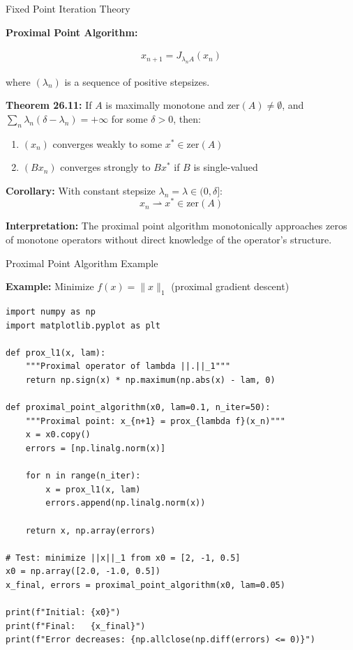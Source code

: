 \documentclass[aspectratio=169,10pt]{beamer}
\begin{document}
\begin{frame}{Fixed Point Iteration Theory}

\textbf{Proximal Point Algorithm:}

\begin{align*}
  x_{n+1} = J_{\lambda_n A}(x_n)
\end{align*}

where $(\lambda_n)$ is a sequence of positive stepsizes.

\vspace{0.3cm}
\textbf{Theorem 26.11:} If $A$ is maximally monotone and $\text{zer}(A) \neq \emptyset$, and $\sum_n \lambda_n(\delta - \lambda_n) = +\infty$ for some $\delta > 0$, then:
\begin{enumerate}
  \item $(x_n)$ converges weakly to some $x^* \in \text{zer}(A)$

  \item $(B x_n)$ converges strongly to $B x^*$ if $B$ is single-valued
\end{enumerate}

\vspace{0.3cm}
\textbf{Corollary:} With constant stepsize $\lambda_n = \lambda \in (0, \delta]$:
\[ x_n \rightharpoonup x^* \in \text{zer}(A) \]

\vspace{0.3cm}
\textbf{Interpretation:} The proximal point algorithm monotonically approaches zeros of monotone operators without direct knowledge of the operator's structure.

\end{frame}

\begin{frame}[fragile]{Proximal Point Algorithm Example}

\textbf{Example:} Minimize $f(x) = \|x\|_1$ (proximal gradient descent)

\vspace{0.2cm}
\lstset{basicstyle=\ttfamily\footnotesize}
\begin{lstlisting}
import numpy as np
import matplotlib.pyplot as plt

def prox_l1(x, lam):
    """Proximal operator of lambda ||.||_1"""
    return np.sign(x) * np.maximum(np.abs(x) - lam, 0)

def proximal_point_algorithm(x0, lam=0.1, n_iter=50):
    """Proximal point: x_{n+1} = prox_{lambda f}(x_n)"""
    x = x0.copy()
    errors = [np.linalg.norm(x)]

    for n in range(n_iter):
        x = prox_l1(x, lam)
        errors.append(np.linalg.norm(x))

    return x, np.array(errors)

# Test: minimize ||x||_1 from x0 = [2, -1, 0.5]
x0 = np.array([2.0, -1.0, 0.5])
x_final, errors = proximal_point_algorithm(x0, lam=0.05)

print(f"Initial: {x0}")
print(f"Final:   {x_final}")
print(f"Error decreases: {np.allclose(np.diff(errors) <= 0)}")
\end{lstlisting}

\end{frame}
\end{document}
